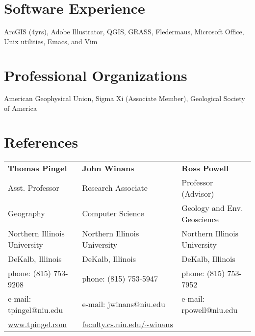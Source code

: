 \documentclass{cv_TOH}
\begin{document}
\section{Software Experience}
ArcGIS (4yrs), Adobe Illustrator, QGIS, GRASS, Fledermaus, Microsoft Office, Unix utilities, Emacs, and Vim

\section{Professional Organizations}
American Geophysical Union, Sigma Xi (Associate Member), Geological Society of America

\section{References}
\begin{tabular}{@{}p{6cm}p{6cm}p{6cm}}
 \textbf{Thomas Pingel}            & \textbf{John Winans}              &   \textbf{Ross Powell}           \\
 Asst. Professor                   &  Research Associate               &   Professor (Advisor)            \\ 
 Geography                         &  Computer Science                 &   Geology and Env. Geoscience    \\
 Northern Illinois University      &  Northern Illinois University     &   Northern Illinois University   \\ 
 DeKalb, Illinois                  &  DeKalb, Illinois                 &   DeKalb, Illinois               \\
 phone: (815) 753-9208             &  phone: (815) 753-5947            &   phone: (815) 753-7952          \\
 e-mail: tpingel@niu.edu           &  e-mail: jwinans@niu.edu          &   e-mail: rpowell@niu.edu        \\
 \url{www.tpingel.com}             &  \url{faculty.cs.niu.edu/~winans} &                                  \\     
\end{tabular}
\end{document}
